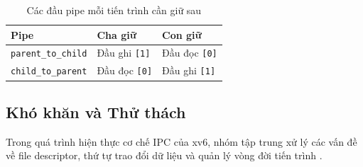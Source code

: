 \begin{table}[H]
    \centering
    \small
    \begin{tabularx}{0.85\textwidth}{lXX}
        \toprule
        Pipe & Cha giữ & Con giữ \\
        \midrule
        \texttt{parent\_to\_child} & Đầu ghi \texttt{[1]} & Đầu đọc \texttt{[0]} \\
        \texttt{child\_to\_parent} & Đầu đọc \texttt{[0]} & Đầu ghi \texttt{[1]} \\
        \bottomrule
    \end{tabularx}
    \caption{Các đầu pipe mỗi tiến trình cần giữ sau }
    \label{tab:pingpong_pipes}
\end{table}

\subsection{Khó khăn và Thử thách}
Trong quá trình hiện thực cơ chế IPC của xv6, nhóm tập trung xử lý
các vấn đề về file descriptor, thứ tự trao đổi dữ liệu và quản lý
vòng đời tiến trình \cite{xv6book,remzi2018ostep}.

